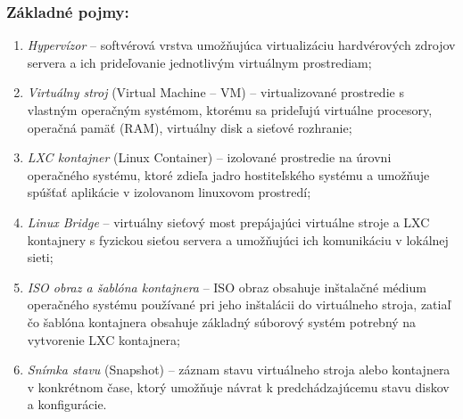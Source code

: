 \subsubsection*{Základné pojmy:}
\begin{enumerate}
    \item \emph{Hypervízor} -- softvérová vrstva umožňujúca
    virtualizáciu hardvérových zdrojov servera a ich prideľovanie
    jednotlivým virtuálnym prostrediam;

    \item \emph{Virtuálny stroj} (Virtual Machine -- VM) --
    virtualizované prostredie s vlastným operačným systémom,
    ktorému sa prideľujú virtuálne procesory, operačná pamäť (RAM),
    virtuálny disk a sieťové rozhranie;

    \item \emph{LXC kontajner} (Linux Container) --
    izolované prostredie na úrovni operačného systému, ktoré
    zdieľa jadro hostiteľského systému a umožňuje spúšťať
    aplikácie v izolovanom linuxovom prostredí;

    \item \emph{Linux Bridge} -- virtuálny sieťový most
    prepájajúci virtuálne stroje a LXC kontajnery s fyzickou
    sieťou servera a umožňujúci ich komunikáciu v lokálnej sieti;

    \item \emph{ISO obraz a šablóna kontajnera} -- ISO obraz obsahuje inštalačné 
    médium operačného systému používané pri jeho inštalácii do
    virtuálneho stroja, zatiaľ čo šablóna kontajnera obsahuje
    základný súborový systém potrebný na vytvorenie LXC kontajnera;

    \item \emph{Snímka stavu} (Snapshot) -- záznam stavu
    virtuálneho stroja alebo kontajnera v konkrétnom čase,
    ktorý umožňuje návrat k predchádzajúcemu stavu diskov
    a konfigurácie.
\end{enumerate}

